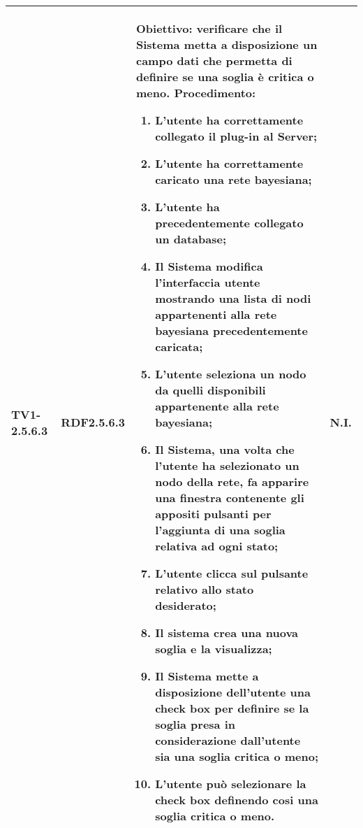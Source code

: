\begin{longtable}{|C{.15\textwidth}|C{.13\textwidth}|m{.52\textwidth}|C{.08\textwidth}|}
TV1-2.5.6.3 & RDF2.5.6.3  &
	\textbf{Obiettivo}: verificare che il Sistema metta a disposizione un campo dati che permetta di definire se una soglia è critica o meno.  \newline
	\textbf{Procedimento}:
	\begin{enumerate}
		\item L'utente ha correttamente collegato il plug-in al Server;
		\item L'utente ha correttamente caricato una rete bayesiana;
		\item L'utente ha precedentemente collegato un database;
		\item Il Sistema modifica l'interfaccia utente mostrando una lista di nodi appartenenti alla rete bayesiana precedentemente caricata;
		\item L'utente seleziona un nodo da quelli disponibili appartenente alla rete bayesiana;
		\item Il Sistema, una volta che l'utente ha selezionato un nodo della rete, fa apparire una finestra contenente gli appositi pulsanti per l'aggiunta di una soglia relativa ad ogni stato;
		\item L'utente clicca sul pulsante relativo allo stato desiderato;
		\item Il sistema crea una nuova soglia e la visualizza;
		\item Il Sistema mette a disposizione dell'utente una check box per definire se la soglia presa in considerazione dall'utente sia una soglia critica o meno;
		\item L'utente può selezionare la check box definendo cosi una soglia critica o meno.
	\end{enumerate}
	& N.I. \\
\hline


\end{longtable}
